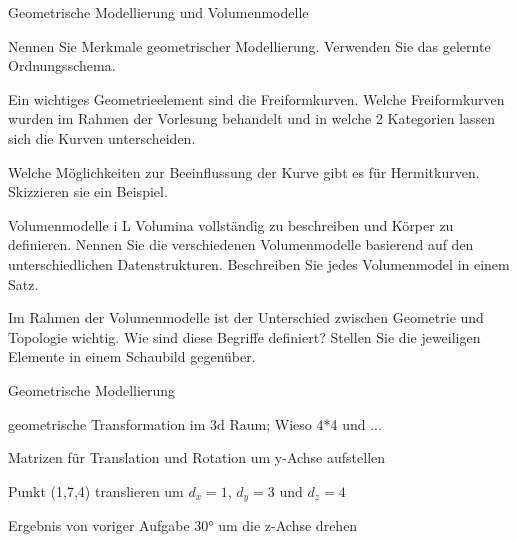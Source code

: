 \documentclass[
	ngerman,
	color = black,
	]{tudaexercise}
\begin{document}
\begin{task}[credit=21 P]{Geometrische Modellierung und Volumenmodelle}
	\begin{subtask}[credit=6 P]
		Nennen Sie Merkmale geometrischer Modellierung.
		Verwenden Sie das gelernte Ordnungsschema.
	\end{subtask}
	
	\begin{subtask}[credit=2{,}5 P]
		Ein wichtiges Geometrieelement sind die Freiformkurven.
		Welche Freiformkurven wurden im Rahmen der Vorlesung behandelt und in welche 2 Kategorien lassen sich die Kurven unterscheiden.
	\end{subtask}
	
	\begin{subtask}[credit=1{,}5 P]
		Welche Möglichkeiten zur Beeinflussung der Kurve gibt es für Hermitkurven.
		Skizzieren sie ein Beispiel.
	\end{subtask}
	
	\begin{subtask}[credit=6 P]
		Volumenmodelle i L Volumina vollständig zu beschreiben und Körper zu definieren.
		Nennen Sie die verschiedenen Volumenmodelle basierend auf den unterschiedlichen Datenstrukturen.
		Beschreiben Sie jedes Volumenmodel in einem Satz.
	\end{subtask}
	
	\begin{subtask}[credit=5 P]
		Im Rahmen der Volumenmodelle ist der Unterschied zwischen Geometrie und Topologie wichtig.
		Wie sind diese Begriffe definiert?
		Stellen Sie die jeweiligen Elemente in einem Schaubild gegenüber.
	\end{subtask}
	
\end{task}

\begin{task}[credit=9 P]{Geometrische Modellierung}
	\begin{subtask}[credit=2 P]
		geometrische Transformation im 3d Raum; Wieso 4*4 und ...
	\end{subtask}
	
	\begin{subtask}[credit=2 P]
		Matrizen für Translation und Rotation um y-Achse aufstellen
	\end{subtask}
		
	\begin{subtask}[credit=3 P]
		Punkt (1,7,4) translieren um $d_x=1$, $d_y=3$ und $d_z=4$
	\end{subtask}
	
	\begin{subtask}[credit=2 P]
		Ergebnis von voriger Aufgabe 30° um die z-Achse drehen
	\end{subtask}
\end{task}
\end{document}
